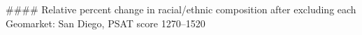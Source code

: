 #### Relative percent change in racial/ethnic composition after excluding each Geomarket: San Diego, PSAT score 1270–1520

